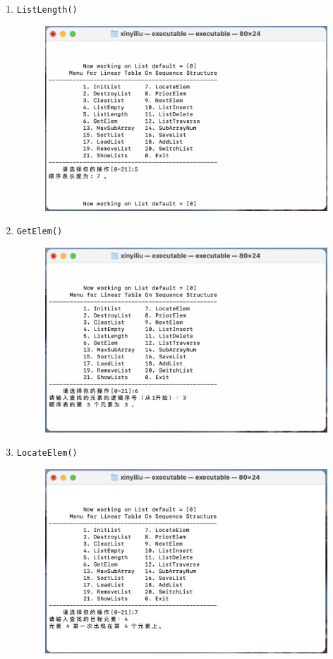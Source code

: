 \documentclass[supercite]{Experimental_Report}
\theoremstyle{definition}
\begin{document}
\begin{enumerate}
\item \verb|ListLength()|
	\begin{figure}[!htb]
		\includegraphics[width=0.8\linewidth]{images/截屏2023-06-01 18.23.42.png}
	\end{figure}
	\FloatBarrier

\newpage

\item \verb|GetElem()|
	\begin{figure}[!htb]
		\includegraphics[width=0.8\linewidth]{images/截屏2023-06-01 18.24.07.png}
	\end{figure}
	\FloatBarrier

\item \verb|LocateElem()|
	\begin{figure}[!htb]
		\includegraphics[width=0.8\linewidth]{images/截屏2023-06-01 18.22.44.png}
	\end{figure}
	\FloatBarrier
	

\end{enumerate}
\end{document}
